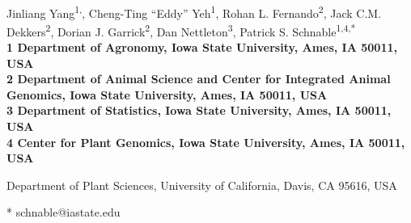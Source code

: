 \documentclass[10pt,letterpaper]{article}
\date{}
\begin{document}
\vspace*{0.35in}

\begin{flushleft}
{\Large
\textbf{}
}
\newline
\\
Jinliang Yang\textsuperscript{1,\textcurrency},
Cheng-Ting “Eddy” Yeh\textsuperscript{1},
Rohan L. Fernando\textsuperscript{2},
Jack C.M. Dekkers\textsuperscript{2},
Dorian J. Garrick\textsuperscript{2},
Dan Nettleton\textsuperscript{3},
Patrick S. Schnable\textsuperscript{1,4,*}
\\
\bigskip
\bf{1} Department of Agronomy, Iowa State University, Ames, IA 50011, USA
\\
\bf{2} Department of Animal Science and Center for Integrated Animal Genomics, Iowa State University, Ames, IA 50011, USA
\\
\bf{3} Department of Statistics, Iowa State University, Ames, IA 50011, USA
\\
\bf{4} Center for Plant Genomics, Iowa State University, Ames, IA 50011, USA
\\
\bigskip

% 
%


\textcurrency Department of Plant Sciences, University of California, Davis, CA 95616, USA



* schnable@iastate.edu

\end{flushleft}
\end{document}
